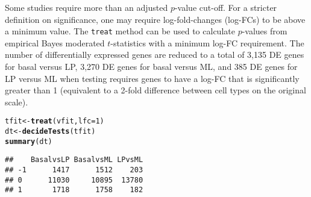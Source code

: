 \documentclass[10pt,a4paper]{extarticle}\usepackage[]{graphicx}\usepackage[]{color}
\makeatletter
\newcommand{\hlnum}[1]{\textcolor[rgb]{0.686,0.059,0.569}{#1}}%
\newcommand{\hlstd}[1]{\textcolor[rgb]{0.345,0.345,0.345}{#1}}%
\newcommand{\hlkwb}[1]{\textcolor[rgb]{0.69,0.353,0.396}{#1}}%
\newcommand{\hlkwc}[1]{\textcolor[rgb]{0.333,0.667,0.333}{#1}}%
\newcommand{\hlkwd}[1]{\textcolor[rgb]{0.737,0.353,0.396}{\textbf{#1}}}%
\newenvironment{kframe}{%
 \def\at@end@of@kframe{}%
 \ifinner\ifhmode%
  \def\at@end@of@kframe{\end{minipage}}%
  \begin{minipage}{\columnwidth}%
 \fi\fi%
 \def\FrameCommand##1{\hskip\@totalleftmargin \hskip-\fboxsep
 \colorbox{shadecolor}{##1}\hskip-\fboxsep
     \hskip-\linewidth \hskip-\@totalleftmargin \hskip\columnwidth}%
 \MakeFramed {\advance\hsize-\width
   \@totalleftmargin\z@ \linewidth\hsize
   \@setminipage}}%
 {\par\unskip\endMakeFramed%
 \at@end@of@kframe}
\newenvironment{knitrout}{}{} %
\makeatother
\begin{document}
Some studies require more than an adjusted $p$-value cut-off. For a stricter definition on significance, one may require log-fold-changes (log-FCs) to be above a minimum value. The \texttt{treat} method \cite{McCarthy:Bioinf:2009} can be used to calculate $p$-values from empirical Bayes moderated $t$-statistics with a minimum log-FC requirement. The number of differentially expressed genes are reduced to a total of 3,135 DE genes for basal versus LP, 3,270 DE genes for basal versus ML, and 385 DE genes for LP versus ML when testing requires genes to have a log-FC that is significantly greater than 1 (equivalent to a 2-fold difference between cell types on the original scale).
\begin{knitrout}
\color{fgcolor}\begin{kframe}
\begin{alltt}
\hlstd{tfit} \hlkwb{<-} \hlkwd{treat}\hlstd{(vfit,} \hlkwc{lfc}\hlstd{=}\hlnum{1}\hlstd{)}
\hlstd{dt} \hlkwb{<-} \hlkwd{decideTests}\hlstd{(tfit)}
\hlkwd{summary}\hlstd{(dt)}
\end{alltt}
\begin{verbatim}
##    BasalvsLP BasalvsML LPvsML
## -1      1417      1512    203
## 0      11030     10895  13780
## 1       1718      1758    182
\end{verbatim}
\end{kframe}
\end{knitrout}
\end{document}
